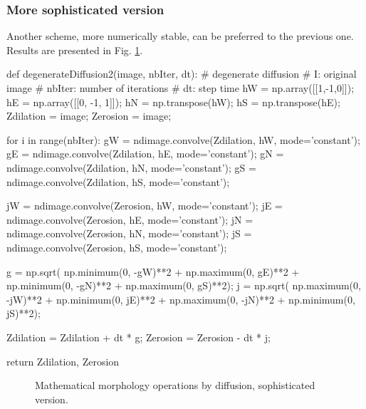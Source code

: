 \subsubsection{More sophisticated version}
Another scheme, more numerically stable, can be preferred to the previous one.
Results are presented in Fig. \ref{fig:pde:python:dd2}.

\begin{python}
def degenerateDiffusion2(image, nbIter, dt):
    # degenerate diffusion
    # I: original image
    # nbIter: number of iterations
    # dt: step time
    hW = np.array([[1,-1,0]]);
    hE = np.array([[0, -1, 1]]);
    hN = np.transpose(hW);
    hS = np.transpose(hE);
    Zdilation = image;
    Zerosion  = image;
    
    for i in range(nbIter):
        gW = ndimage.convolve(Zdilation, hW, mode='constant');
        gE = ndimage.convolve(Zdilation, hE, mode='constant');
        gN = ndimage.convolve(Zdilation, hN, mode='constant');
        gS = ndimage.convolve(Zdilation, hS, mode='constant');

        jW = ndimage.convolve(Zerosion, hW, mode='constant');
        jE = ndimage.convolve(Zerosion, hE, mode='constant');
        jN = ndimage.convolve(Zerosion, hN, mode='constant');
        jS = ndimage.convolve(Zerosion, hS, mode='constant');
        
        g = np.sqrt( np.minimum(0, -gW)**2 + np.maximum(0, gE)**2 + np.minimum(0, -gN)**2 + np.maximum(0, gS)**2);
        j = np.sqrt( np.maximum(0, -jW)**2 + np.minimum(0, jE)**2 + np.maximum(0, -jN)**2 + np.minimum(0, jS)**2);
        
        Zdilation = Zdilation + dt * g;
        Zerosion = Zerosion - dt * j;
        
    return Zdilation, Zerosion
\end{python}
\begin{figure}[htbp]
 \centering\caption{Mathematical morphology operations by diffusion, sophisticated version.}%
 \hspace{1cm}
\label{fig:pde:python:dd2}
\end{figure}